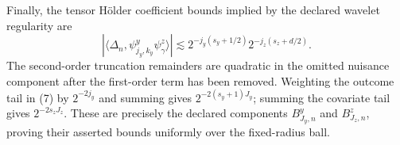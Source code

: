 Finally, the tensor H\"older coefficient bounds implied by the declared wavelet regularity are
\[
 |\langle\Delta_n,\psi^y_{j_y,k_y}\psi^z_\gamma\rangle|
 \lesssim2^{-j_y(s_y+1/2)}2^{-j_z(s_z+d/2)}.            \tag{7}
\]
The second-order truncation remainders are quadratic in the omitted nuisance component after the first-order term has been removed.  Weighting the outcome tail in (7) by \(2^{-2j_y}\) and summing gives \(2^{-2(s_y+1)J_y}\); summing the covariate tail gives \(2^{-2s_zJ_z}\).  These are precisely the declared components \(B^y_{J_y,n}\) and \(B^z_{J_z,n}\), proving their asserted bounds uniformly over the fixed-radius ball.